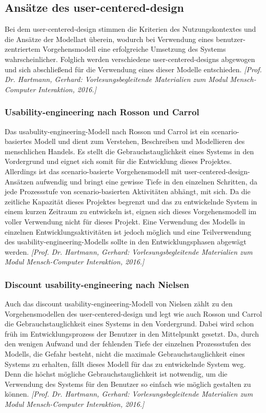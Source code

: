 	\subsection{Ansätze des user-centered-design}
	Bei dem user-centered-design stimmen die Kriterien des Nutzungskontextes und die Ansätze der Modellart überein, wodurch bei Verwendung eines benutzer-zentriertem Vorgehensmodell eine erfolgreiche Umsetzung des Systems wahrscheinlicher. Folglich werden verschiedene user-centered-designs abgewogen und sich abschließend für die Verwendung eines dieser Modelle entschieden. \emph{[Prof. Dr. Hartmann, Gerhard: Vorlesungsbegleitende Materialien zum Modul Mensch-Computer Interaktion, 2016.]}
	\subsubsection{Usability-engineering nach Rosson und Carrol}
	Das usabulity-engineering-Modell nach Rosson und Carrol ist ein scenario-basiertes Modell und dient zum Verstehen, Beschreiben und Modellieren des menschlichen Handels. Es stellt die Gebrauchstauglichkeit eines Systems in den Vordergrund und eignet sich somit für die Entwicklung dieses Projektes. Allerdings ist das scenario-basierte Vorgehensmodell mit user-centered-design-Ansätzen aufwendig und bringt eine gewisse Tiefe in den einzelnen Schritten, da jede Prozessstufe von scenario-basierten Aktivitäten abhängt, mit sich. Da die zeitliche Kapazität dieses Projektes begrenzt und das zu entwickelnde System in einem kurzen Zeitraum zu entwickeln ist, eignen sich dieses Vorgehensmodell im voller Verwendung nicht für dieses Projekt. Eine Verwendung des Modells in einzelnen Entwicklungsaktivitäten ist jedoch möglich und eine Teilverwendung des usability-engineering-Modells sollte in den Entwicklungsphasen abgewägt werden. \emph{[Prof. Dr. Hartmann, Gerhard: Vorlesungsbegleitende Materialien zum Modul Mensch-Computer Interaktion, 2016.]}
	\subsubsection{Discount usability-engineering nach Nielsen}
	Auch das discount usability-engineering-Modell von Nielsen zählt zu den Vorgehensmodellen des user-centered-design und legt wie auch Rosson und Carrol die Gebrauchstauglichkeit eines Systems in den Vordergrund. Dabei wird schon früh im Entwicklungsprozess der Benutzer in den Mittelpunkt gesetzt. Da, durch den wenigen Aufwand und der fehlenden Tiefe der einzelnen Prozessstufen des Modells, die Gefahr besteht, nicht die maximale Gebrauchstauglichkeit eines Systems zu erhalten, fällt dieses Modell für das zu entwickelnde System weg. Denn die höchst mögliche Gebrauchstauglichkeit ist notwendig, um die Verwendung des Systems für den Benutzer so einfach wie möglich gestalten zu können. \emph{[Prof. Dr. Hartmann, Gerhard: Vorlesungsbegleitende Materialien zum Modul Mensch-Computer Interaktion, 2016.]}
